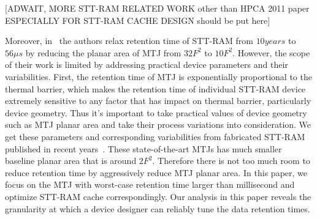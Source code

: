 [ADWAIT, MORE STT-RAM RELATED WORK other than HPCA 2011 paper ESPECIALLY FOR STT-RAM CACHE DESIGN should be put here]

Moreover, in~\cite{STTRAM:HPCA11} the authors relax retention time of STT-RAM from $10 years$ to $56 \mu s$ by reducing the planar area of MTJ from $32F^2$ to $10F^2$. However, the scope of their work is limited by addressing practical device parameters and their variabilities. First, the retention time of MTJ is exponentially proportional to the thermal barrier, which makes the retention time of individual STT-RAM device extremely sensitive to any factor that has impact on thermal barrier, particularly device geometry. Thus it's important to take practical values of device geometry such as MTJ planar area and take their process variations into consideration. We get these parameters and corresponding variabilities from fabricated STT-RAM published in recent years~\cite{PMTJ:Toshiba08,STTRAM:EDL11,STTRAM:Qualcomm09,STTRAM:Grandis11}. These state-of-the-art MTJs has much smaller baseline planar area that is around $2F^2$. Therefore there is not too much room to reduce retention time by aggressively reduce MTJ planar area. In this paper, we focus on the MTJ with worst-case retention time larger than millisecond and optimize STT-RAM cache correspondingly. Our analysis in this paper reveals the granularity at which a device designer can reliably tune the data retention times. 